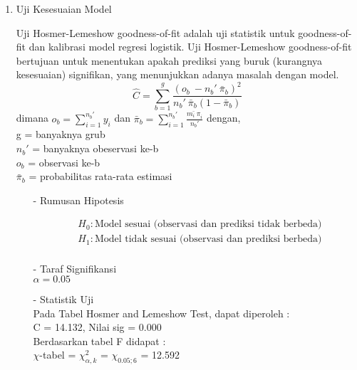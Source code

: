 \begin{enumerate}
    \item Uji Kesesuaian Model
    \begin{sloppypar}
        Uji Hosmer-Lemeshow goodness-of-fit adalah uji statistik untuk goodness-of-fit dan kalibrasi model regresi logistik. Uji Hosmer-Lemeshow goodness-of-fit bertujuan untuk menentukan apakah prediksi yang buruk (kurangnya kesesuaian) signifikan, yang menunjukkan adanya masalah dengan model. $$\hat{C} = \sum_{b=1}^{g} \frac{(o_b\ - n_b'\ \bar{\pi}_b)^2}{n_b'\ \bar{\pi}_b (1 - \bar{\pi}_b)}$$
        dimana $o_b = \sum_{i=1}^{n_b'} y_i$ dan $\bar{\pi}_b = \sum_{i=1}^{n_b'} \frac{\bar{m_i\ \pi}_i}{n_b'}$
        dengan, \\g = banyaknya grub \\$n_b'$ = banyaknya obeservasi ke-b\\$o_b$ = observasi ke-b \\$\bar{\pi}_b$ = probabilitas rata-rata estimasi
    \end{sloppypar}
    \begin{test}{
    \begin{enumerate}
        \item[-] Rumusan Hipotesis \\
        \begin{fleqn}[\parindent]
            \begin{equation*}
            \begin{split}
            &H_0 : \text{Model sesuai (observasi dan prediksi tidak berbeda)} \\ 
            &H_1 : \text{Model tidak sesuai (observasi dan prediksi berbeda)} \\
            \end{split}
            \end{equation*}
        \end{fleqn}
    
        \item[-] Taraf Signifikansi \\
        $\alpha = 0.05$
    
        \item[-] Statistik Uji \\
        Pada Tabel Hosmer and Lemeshow Test, dapat diperoleh : \\
        C = 14.132, Nilai sig = 0.000 \\
        Berdasarkan tabel F didapat : \\
        $\chi$-tabel = $\chi_{\alpha, k}^2$ = $\chi_{0.05; 6}$ = 12.592
    

\end{enumerate}}
\end{test}
\end{enumerate}
